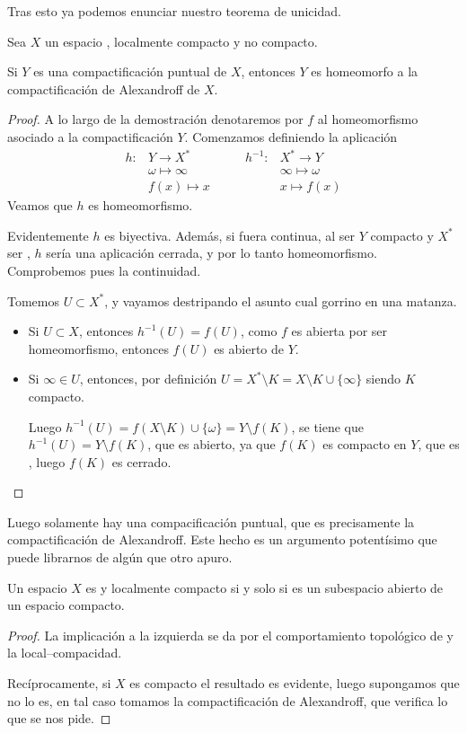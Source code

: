 Tras esto ya podemos enunciar nuestro teorema de unicidad.
\begin{theo}[Unicidad]
	Sea $X$ un espacio \hausdorff, localmente compacto y no compacto.
	
	Si $Y$ es una compactificación puntual de $X$, entonces $Y$ es homeomorfo a la compactificación de Alexandroff de $X$.
\end{theo}
\begin{proof}A lo largo de la demostración denotaremos por $f$ al homeomorfismo asociado a la compactificación $Y$. Comenzamos definiendo la aplicación
	\begin{equation*}
		\begin{array}{cc}
		h:& Y \to X^*\\
		& \omega\mapsto \infty\\
		& f(x)\mapsto x
		\end{array}\qquad
		\begin{array}{cc}
		h^{-1}:& X^* \to Y\\
		& \infty\mapsto \omega\\
		& x\mapsto f(x)
		\end{array}
	\end{equation*}
	Veamos que $h$ es homeomorfismo.
	
	Evidentemente $h$ es biyectiva. Además, si fuera continua, al ser $Y$ compacto y $X^*$ ser \hausdorff, $h$ sería una aplicación cerrada, y por lo tanto homeomorfismo. Comprobemos pues la continuidad.
	
	Tomemos $U\subset X^*$, y vayamos destripando el asunto cual gorrino en una matanza.
	\begin{itemize}
		\item Si $U\subset X$, entonces $h^{-1}(U)=f(U)$, como $f$ es abierta por ser homeomorfismo, entonces $f(U)$ es abierto de $Y$.
		\item Si $\infty\in U$, entonces, por definición $U=X^*\setminus K=X\setminus K\cup\{\infty\}$ siendo $K$ compacto.
		
		Luego $h^{-1}(U)=f(X\setminus K)\cup \{\omega\}=Y\setminus f(K)$, se tiene que $h^{-1}(U)=Y\setminus f(K)$, que es abierto, ya que $f(K)$ es compacto en $Y$, que es \hausdorff, luego $f(K)$ es cerrado.\qedhere
	\end{itemize}
\end{proof}
Luego solamente hay una compacificación puntual, que es precisamente la compactificación de Alexandroff. Este hecho es un argumento potentísimo que puede librarnos de algún que otro apuro.
\begin{cor}[Caracterización]
	Un espacio $X$ es \hausdorff y localmente compacto si y solo si es un subespacio abierto de un espacio \hausdorff compacto.
\end{cor}
\begin{proof}
	La implicación a la izquierda se da por el comportamiento topológico de \hausdorff y la local--compacidad.
	
	Recíprocamente, si $X$ es compacto el resultado es evidente, luego supongamos que no lo es, en tal caso tomamos la compactificación de Alexandroff, que verifica lo que se nos pide.
\end{proof}

